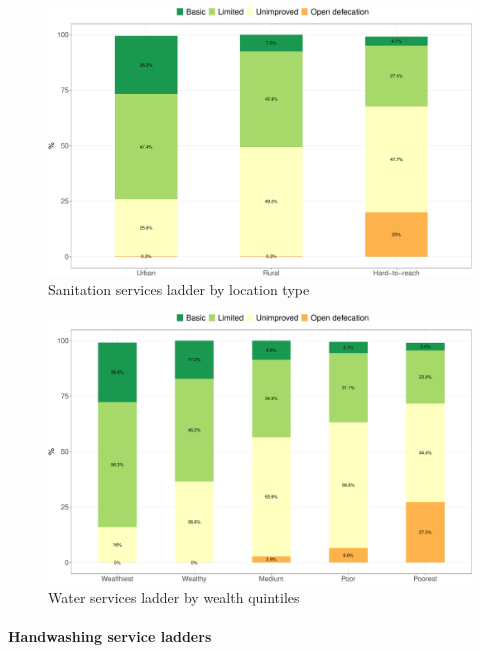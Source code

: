 \documentclass[12pt,a4paper]{article}
\let\oldparagraph\paragraph
\renewcommand{\paragraph}[1]{\oldparagraph{#1}\mbox{}}
\begin{document}
\newpage

\begin{figure}[H]

{\centering \includegraphics{kayahReport_files/figure-latex/san1plot-1} 

}

\caption{Sanitation services ladder by location type}\label{fig:san1plot}
\end{figure}

\begin{figure}[H]

{\centering \includegraphics{kayahReport_files/figure-latex/san2plot-1} 

}

\caption{Water services ladder by wealth quintiles}\label{fig:san2plot}
\end{figure}

\hypertarget{handwashing-service-ladders}{%
\paragraph{Handwashing service ladders}\label{handwashing-service-ladders}}
\end{document}
